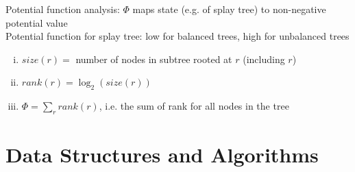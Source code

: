 \documentclass{article}
\begin{document}
			Potential function analysis: $\Phi$ maps state (e.g. of splay tree) to non-negative potential value \\
			Potential function for splay tree: low for balanced trees, high for unbalanced trees
			\begin{enumerate}[(i)]
				\item $size(r) =$ number of nodes in subtree rooted at $r$ (including $r$)
				\item $rank(r) = \log_2(size(r))$
				\item $\Phi = \sum_r rank(r)$, i.e. the sum of rank for all nodes in the tree
				\end{enumerate}
		\clearpage
	
	\section{Data Structures and Algorithms}
\end{document}
